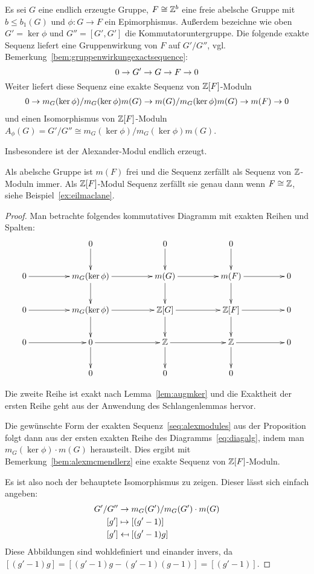 \begin{prop}
\label{prop:alexmodules}
	Es sei $G$ eine endlich erzeugte Gruppe, $F \cong \mathbb{Z}^b$ eine freie abelsche Gruppe mit $b\leq b_1(G)$ und $\phi: G \to F$ ein Epimorphismus. Außerdem bezeichne wie oben $G'=\ker\phi$ und $G''=[G',G']$ die Kommutatoruntergruppe. Die folgende exakte Sequenz liefert eine Gruppenwirkung von $F$ auf $G'/G''$, vgl.\,Bemerkung~\ref{bem:gruppenwirkungexactsequence}:
	\[
		0\to G'\to G\to F\to0
	\]
	Weiter liefert diese Sequenz eine exakte Sequenz von $\mathbb{Z}[F]$-Moduln
		\begin{align}
		0\to m_G(\ker\phi)/m_G(\ker\phi)m(G)\to m(G)/m_G(\ker\phi)m(G)\to m(F)\to0 \label{seq:alexmodules}
		\end{align}
		und einen Isomorphismus von $\mathbb{Z}[F]$-Moduln $A_\phi(G) = G'/G'' \cong m_G(\ker\phi)/m_G(\ker\phi)m(G)$.

	Insbesondere ist der Alexander-Modul endlich erzeugt.
\end{prop}
\begin{bem}
	Als abelsche Gruppe ist $m(F)$ frei und die Sequenz zerfällt als Sequenz von $\mathbb{Z}$-Moduln immer. Als $\mathbb{Z}[F]$-Modul Sequenz zerfällt sie genau dann wenn $F\cong \mathbb{Z}$, siehe Beispiel~\ref{ex:eilmaclane}.
\end{bem}
\begin{proof}
		Man betrachte folgendes kommutatives Diagramm mit exakten Reihen und Spalten:	
		\begin{equation}
		\label{eq:diagalg}
			\begin{xy}
				\xymatrixcolsep{4pc}\xymatrix{	
									& 0 \ar[d] & 0\ar[d] & 0\ar[d]&\\
							0 \ar[r]&	m_G(\ker\phi) \ar[r] \ar[d]&	m(G) \ar[r] \ar[d]& m(F) \ar[r] \ar[d]&	0\\
							0 \ar[r]&	m_G(\ker\phi) \ar[r] \ar[d]&	\ZZ[G] \ar[r] \ar[d]& \ZZ[F] \ar[r] \ar[d]&	0\\
							0 \ar[r]&		0	\ar[d]\ar[r] 	&	\ZZ \ar[d] \ar[r]	&	\ZZ \ar[r] \ar[d] &		0\\
							&0&0&0&}
			\end{xy}
		\end{equation}

		Die zweite Reihe ist exakt nach Lemma~\ref{lem:augmker} und die Exaktheit der ersten Reihe geht aus der Anwendung des Schlangenlemmas hervor.

		Die gewünschte Form der exakten Sequenz~\eqref{seq:alexmodules} aus der Proposition folgt dann aus der ersten exakten Reihe des Diagramms~\eqref{eq:diagalg}, indem man $m_G(\ker\phi)\cdot m(G)$ herausteilt. Dies ergibt mit Bemerkung~\ref{bem:alexmcmendlerz} eine exakte Sequenz von $\mathbb{Z}[F]$-Moduln.

		Es ist also noch der behauptete Isomorphismus zu zeigen. Dieser lässt sich einfach angeben:
		\begin{align*}
			G'/G'' 	&\to 		m_G(G')/m_G(G')\cdot m(G)\\
			[g']		&\mapsto	[(g'-1)]\\
			[g']		&\mathrel{\reflectbox{\ensuremath{\mapsto}}}  [(g'-1)g]
		\end{align*}
		Diese Abbildungen sind wohldefiniert und einander invers, da $[(g'-1)g]=[(g'-1)g-(g'-1)(g-1)]=[(g'-1)]$.
	\end{proof}	
